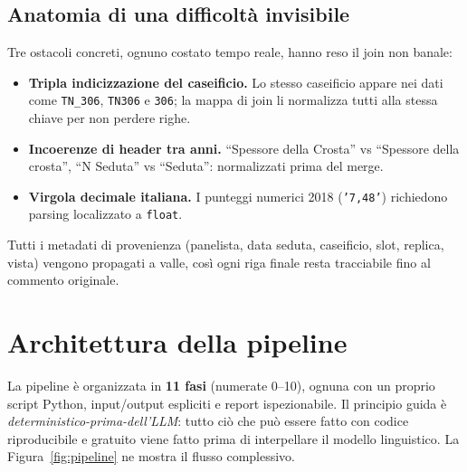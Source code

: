 \documentclass[11pt,a4paper]{article}
\begin{document}
\subsection{Anatomia di una difficolt\`a invisibile}
Tre ostacoli concreti, ognuno costato tempo reale, hanno reso il join non
banale:
\begin{itemize}
\item \textbf{Tripla indicizzazione del caseificio.} Lo stesso caseificio
appare nei dati come \texttt{TN\_306}, \texttt{TN306} e \texttt{306}; la mappa
di join li normalizza tutti alla stessa chiave per non perdere righe.
\item \textbf{Incoerenze di header tra anni.} ``Spessore della Crosta'' vs
``Spessore della crosta'', ``N\textordmasculine{} Seduta'' vs ``Seduta'':
normalizzati prima del merge.
\item \textbf{Virgola decimale italiana.} I punteggi numerici 2018
(\texttt{'7,48'}) richiedono parsing localizzato a \texttt{float}.
\end{itemize}
Tutti i metadati di provenienza (panelista, data seduta, caseificio, slot,
replica, vista) vengono propagati a valle, cos\`i ogni riga finale resta
tracciabile fino al commento originale.

\section{Architettura della pipeline}

La pipeline \`e organizzata in \textbf{11 fasi} (numerate 0--10), ognuna con un
proprio script Python, input/output espliciti e report ispezionabile. Il
principio guida \`e \emph{deterministico-prima-dell'LLM}: tutto ci\`o che pu\`o
essere fatto con codice riproducibile e gratuito viene fatto prima di
interpellare il modello linguistico. La Figura~\ref{fig:pipeline} ne mostra il
flusso complessivo.
\end{document}
